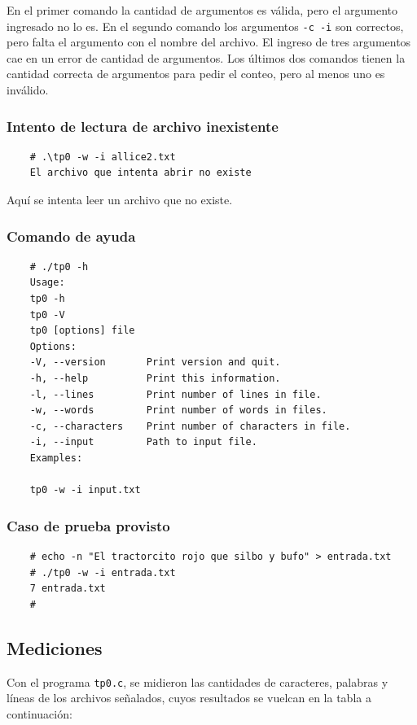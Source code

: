 \documentclass[a4paper, 10pt, twoside, notitlepage]{article}
\begin{document}
En el primer comando la cantidad de argumentos es válida, pero el argumento ingresado no lo es. En el segundo comando los argumentos \texttt{-c -i} son correctos, pero falta el argumento con el nombre del archivo. El ingreso de tres argumentos cae en un error de cantidad de argumentos. Los últimos dos comandos tienen la cantidad correcta de argumentos para pedir el conteo, pero al menos uno es inválido.

\subsubsection*{Intento de lectura de archivo inexistente}
\begin{verbatim}
    # .\tp0 -w -i allice2.txt
    El archivo que intenta abrir no existe
\end{verbatim}

Aquí se intenta leer un archivo que no existe.

\subsubsection*{Comando de ayuda}
\begin{verbatim}
    # ./tp0 -h
    Usage:
    tp0 -h
    tp0 -V
    tp0 [options] file
    Options:
    -V, --version       Print version and quit.
    -h, --help          Print this information.
    -l, --lines         Print number of lines in file.
    -w, --words         Print number of words in files.
    -c, --characters    Print number of characters in file.
    -i, --input	        Path to input file.
    Examples:
    
    tp0 -w -i input.txt
\end{verbatim}

\subsubsection*{Caso de prueba provisto}
\begin{verbatim}
    # echo -n "El tractorcito rojo que silbo y bufo" > entrada.txt
    # ./tp0 -w -i entrada.txt
    7 entrada.txt
    #
\end{verbatim}

\subsection{Mediciones}
Con el programa \texttt{tp0.c}, se midieron las cantidades de caracteres, palabras y líneas de los archivos señalados, cuyos resultados se vuelcan en la tabla a continuación:
\end{document}
